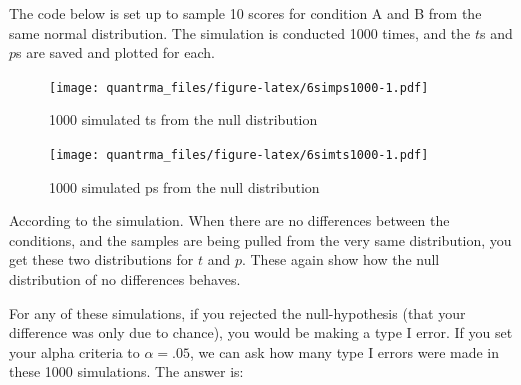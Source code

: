\documentclass[
]{book}
\newenvironment{Shaded}{\begin{snugshade}}{\end{snugshade}}
\newcommand{\ControlFlowTok}[1]{\textcolor[rgb]{0.13,0.29,0.53}{\textbf{#1}}}
\newcommand{\DataTypeTok}[1]{\textcolor[rgb]{0.13,0.29,0.53}{#1}}
\newcommand{\DecValTok}[1]{\textcolor[rgb]{0.00,0.00,0.81}{#1}}
\newcommand{\KeywordTok}[1]{\textcolor[rgb]{0.13,0.29,0.53}{\textbf{#1}}}
\newcommand{\NormalTok}[1]{#1}
\newcommand{\OperatorTok}[1]{\textcolor[rgb]{0.81,0.36,0.00}{\textbf{#1}}}
\newcommand{\StringTok}[1]{\textcolor[rgb]{0.31,0.60,0.02}{#1}}
\begin{document}
The code below is set up to sample 10 scores for condition A and B from the same normal distribution. The simulation is conducted 1000 times, and the \(t\)s and \(p\)s are saved and plotted for each.

\begin{Shaded}
\end{Shaded}

\begin{figure}
\centering
\texttt{[image: quantrma\_files/figure-latex/6simps1000-1.pdf]}
\caption{\label{fig:6simps1000}1000 simulated ts from the null distribution}
\end{figure}

\begin{figure}
\centering
\texttt{[image: quantrma\_files/figure-latex/6simts1000-1.pdf]}
\caption{\label{fig:6simts1000}1000 simulated ps from the null distribution}
\end{figure}

According to the simulation. When there are no differences between the conditions, and the samples are being pulled from the very same distribution, you get these two distributions for \(t\) and \(p\). These again show how the null distribution of no differences behaves.

For any of these simulations, if you rejected the null-hypothesis (that your difference was only due to chance), you would be making a type I error. If you set your alpha criteria to \(\alpha = .05\), we can ask how many type I errors were made in these 1000 simulations. The answer is:
\end{document}
